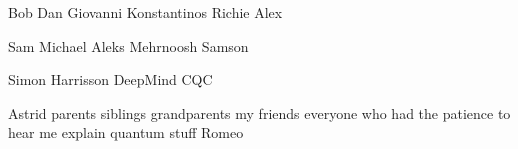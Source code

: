 
\begin{acknowledgements}



Bob
Dan
Giovanni
Konstantinos
Richie
Alex

Sam
Michael
Aleks
Mehrnoosh
Samson

Simon Harrisson
DeepMind
CQC

Astrid
parents
siblings
grandparents
my friends
everyone who had the patience to hear me explain quantum stuff
Romeo

\end{acknowledgements}
